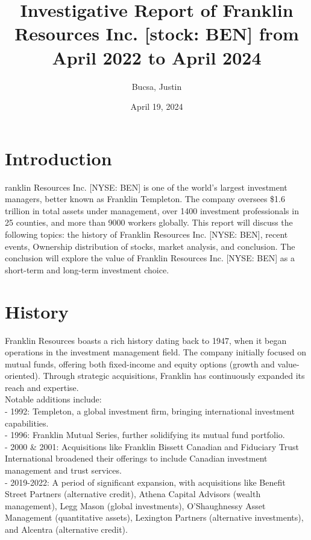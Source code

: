 \documentclass[9pt,a4paper,twoside]{tau}
\title{Investigative Report of Franklin Resources Inc. [stock: BEN] from April 2022 to April 2024}
\author[a,1]{Bucsa, Justin}
\affil[a]{Stealth}
\date{April 19, 2024}
\begin{document}
	
	\maketitle
	\thispagestyle{firststyle}
	\tauabstract
	\tableofcontents
\section{Introduction}

    ranklin Resources Inc. [NYSE: BEN] is one of the world’s largest investment managers, better known as Franklin Templeton. The company oversees \$1.6 trillion in total assets under management, over 1400 investment professionals in 25 counties, and more than 9000 workers globally. This report will discuss the following topics: the history of Franklin Resources Inc. [NYSE: BEN], recent events, Ownership distribution of stocks, market analysis, and conclusion. The conclusion will explore the value of Franklin Resources Inc.
    [NYSE: BEN] as a short-term and long-term investment choice.
    

\section{History}
    
    Franklin Resources boasts a rich history dating back to 1947, when it began operations in the investment management field. The company initially focused on mutual funds, offering both fixed-income and equity options (growth and value-oriented). Through strategic acquisitions, Franklin has continuously expanded its reach and expertise.\\
    Notable additions include: \\
    - 1992: Templeton, a global investment firm, bringing international investment capabilities.\\
    - 1996: Franklin Mutual Series, further solidifying its mutual fund portfolio.\\
    - 2000 \& 2001: Acquisitions like Franklin Bissett Canadian and Fiduciary Trust International broadened their offerings to include Canadian investment management and trust services.\\
    - 2019-2022: A period of significant expansion, with acquisitions like Benefit Street Partners (alternative credit), Athena Capital Advisors (wealth management), Legg Mason (global investments), O’Shaughnessy Asset Management (quantitative assets), Lexington Partners (alternative investments), and Alcentra (alternative credit).\\
    
\end{document}

